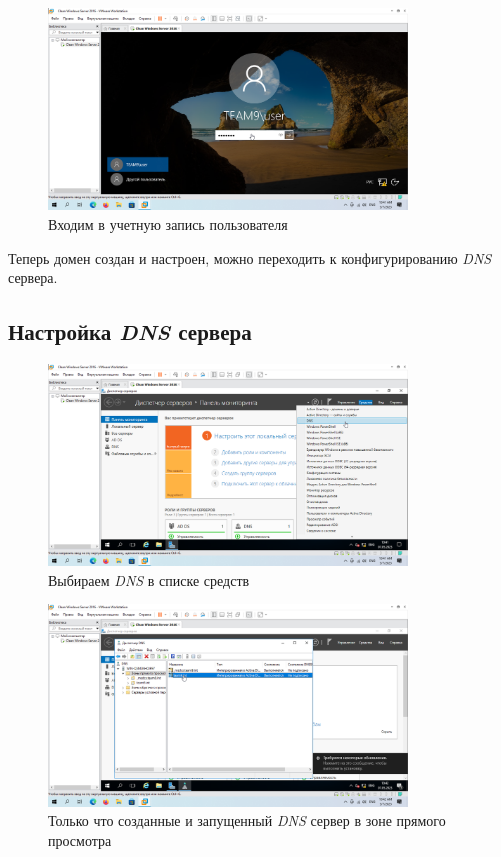 \documentclass[a4paper]{article}
\begin{document}
  \begin{figure}[H]
    \centering
    \includegraphics[width=0.85\textwidth]{9_0062}
    \caption{Входим в учетную запись пользователя}
    \label{img:0062}
  \end{figure}

  Теперь домен создан и настроен, можно переходить к конфигурированию \textit{DNS} сервера.

  \subsection{Настройка \textit{DNS} сервера}

  \begin{figure}[H]
    \centering
    \includegraphics[width=0.85\textwidth]{9_0063}
    \caption{Выбираем \textit{DNS} в списке средств}
    \label{img:0063}
  \end{figure}

  \begin{figure}[H]
    \centering
    \includegraphics[width=0.85\textwidth]{9_0065}
    \caption{Только что созданные и запущенный \textit{DNS} сервер в зоне прямого просмотра}
    \label{img:0065}
  \end{figure}
\end{document}
